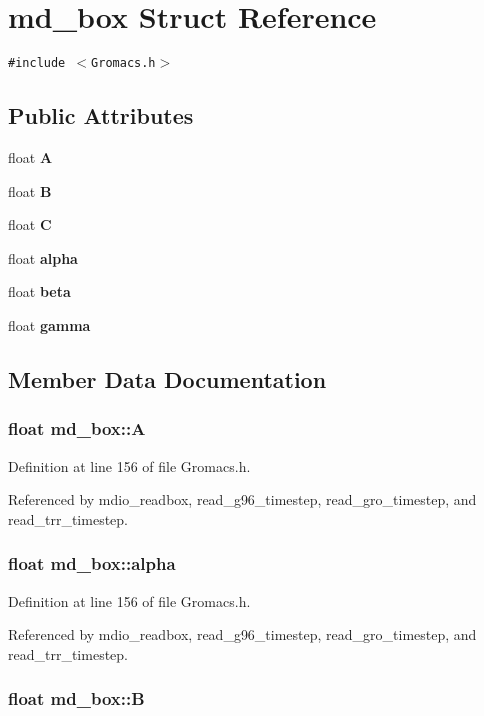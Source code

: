 \section{md\_\-box  Struct Reference}
\label{structmd__box}
{\tt \#include $<$Gromacs.h$>$}

\subsection*{Public Attributes}
\begin{CompactItemize}
\item 
float {\bf A}
\item 
float {\bf B}
\item 
float {\bf C}
\item 
float {\bf alpha}
\item 
float {\bf beta}
\item 
float {\bf gamma}
\end{CompactItemize}


\subsection{Member Data Documentation}
\subsubsection{\setlength{\rightskip}{0pt plus 5cm}float md\_\-box::A}\label{structmd__box_m0}




Definition at line 156 of file Gromacs.h.

Referenced by mdio\_\-readbox, read\_\-g96\_\-timestep, read\_\-gro\_\-timestep, and read\_\-trr\_\-timestep.
\subsubsection{\setlength{\rightskip}{0pt plus 5cm}float md\_\-box::alpha}\label{structmd__box_m3}




Definition at line 156 of file Gromacs.h.

Referenced by mdio\_\-readbox, read\_\-g96\_\-timestep, read\_\-gro\_\-timestep, and read\_\-trr\_\-timestep.
\subsubsection{\setlength{\rightskip}{0pt plus 5cm}float md\_\-box::B}\label{structmd__box_m1}




